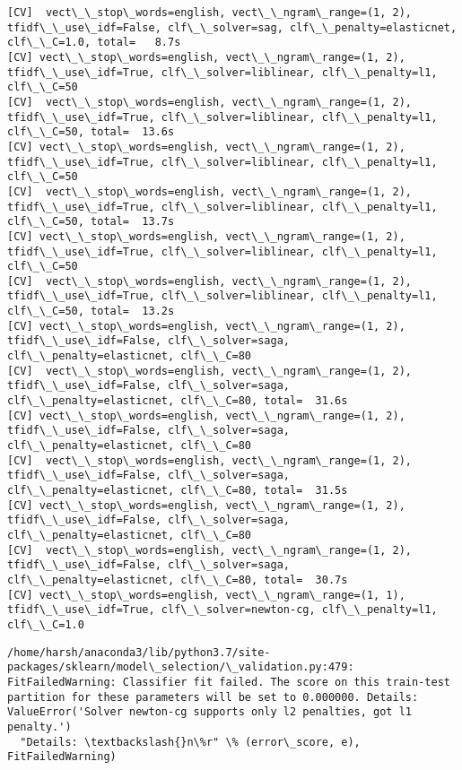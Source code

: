 \documentclass[11pt]{article}
\begin{document}
    \begin{Verbatim}[commandchars=\\\{\}]
[CV]  vect\_\_stop\_words=english, vect\_\_ngram\_range=(1, 2), tfidf\_\_use\_idf=False, clf\_\_solver=sag, clf\_\_penalty=elasticnet, clf\_\_C=1.0, total=   8.7s
[CV] vect\_\_stop\_words=english, vect\_\_ngram\_range=(1, 2), tfidf\_\_use\_idf=True, clf\_\_solver=liblinear, clf\_\_penalty=l1, clf\_\_C=50 
[CV]  vect\_\_stop\_words=english, vect\_\_ngram\_range=(1, 2), tfidf\_\_use\_idf=True, clf\_\_solver=liblinear, clf\_\_penalty=l1, clf\_\_C=50, total=  13.6s
[CV] vect\_\_stop\_words=english, vect\_\_ngram\_range=(1, 2), tfidf\_\_use\_idf=True, clf\_\_solver=liblinear, clf\_\_penalty=l1, clf\_\_C=50 
[CV]  vect\_\_stop\_words=english, vect\_\_ngram\_range=(1, 2), tfidf\_\_use\_idf=True, clf\_\_solver=liblinear, clf\_\_penalty=l1, clf\_\_C=50, total=  13.7s
[CV] vect\_\_stop\_words=english, vect\_\_ngram\_range=(1, 2), tfidf\_\_use\_idf=True, clf\_\_solver=liblinear, clf\_\_penalty=l1, clf\_\_C=50 
[CV]  vect\_\_stop\_words=english, vect\_\_ngram\_range=(1, 2), tfidf\_\_use\_idf=True, clf\_\_solver=liblinear, clf\_\_penalty=l1, clf\_\_C=50, total=  13.2s
[CV] vect\_\_stop\_words=english, vect\_\_ngram\_range=(1, 2), tfidf\_\_use\_idf=False, clf\_\_solver=saga, clf\_\_penalty=elasticnet, clf\_\_C=80 
[CV]  vect\_\_stop\_words=english, vect\_\_ngram\_range=(1, 2), tfidf\_\_use\_idf=False, clf\_\_solver=saga, clf\_\_penalty=elasticnet, clf\_\_C=80, total=  31.6s
[CV] vect\_\_stop\_words=english, vect\_\_ngram\_range=(1, 2), tfidf\_\_use\_idf=False, clf\_\_solver=saga, clf\_\_penalty=elasticnet, clf\_\_C=80 
[CV]  vect\_\_stop\_words=english, vect\_\_ngram\_range=(1, 2), tfidf\_\_use\_idf=False, clf\_\_solver=saga, clf\_\_penalty=elasticnet, clf\_\_C=80, total=  31.5s
[CV] vect\_\_stop\_words=english, vect\_\_ngram\_range=(1, 2), tfidf\_\_use\_idf=False, clf\_\_solver=saga, clf\_\_penalty=elasticnet, clf\_\_C=80 
[CV]  vect\_\_stop\_words=english, vect\_\_ngram\_range=(1, 2), tfidf\_\_use\_idf=False, clf\_\_solver=saga, clf\_\_penalty=elasticnet, clf\_\_C=80, total=  30.7s
[CV] vect\_\_stop\_words=english, vect\_\_ngram\_range=(1, 1), tfidf\_\_use\_idf=True, clf\_\_solver=newton-cg, clf\_\_penalty=l1, clf\_\_C=1.0 

    \end{Verbatim}

    \begin{Verbatim}[commandchars=\\\{\}]
/home/harsh/anaconda3/lib/python3.7/site-packages/sklearn/model\_selection/\_validation.py:479: FitFailedWarning: Classifier fit failed. The score on this train-test partition for these parameters will be set to 0.000000. Details: 
ValueError('Solver newton-cg supports only l2 penalties, got l1 penalty.')
  "Details: \textbackslash{}n\%r" \% (error\_score, e), FitFailedWarning)

    \end{Verbatim}
\end{document}
